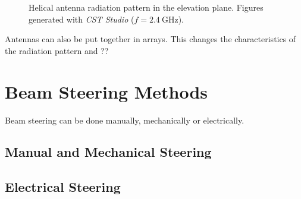 \begin{figure}[H]
\begin{minipage}{0.45\textwidth}
        \caption{Helical antenna radiation pattern in the elevation plane. Figures generated with \textit{CST Studio} ($f=\SI{2.4}{\giga\hertz}$).}
        \label{fig:helical_2}
    \end{minipage}
\end{figure}

Antennas can also be put together in arrays. This changes the characteristics of the radiation pattern and ??



% 

\section{Beam Steering Methods}
Beam steering can be done manually, mechanically or electrically.

\subsection{Manual and Mechanical Steering}

\subsection{Electrical Steering}